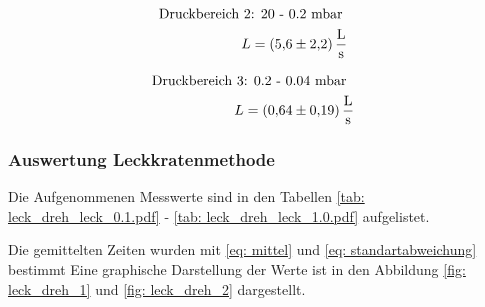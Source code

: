 \begin{align}
  \label{eq:dreh_leit_2}
  \begin{aligned}
  \text{Druckbereich 2} &\text{: 20 - 0.2 mbar}& \\
   L&=\SI{5.6\pm 2.2}{\litre\per\second}
\end{aligned}
\end{align}

\begin{align}
  \label{eq:dreh_leit_3}
  \begin{aligned}
  \text{Druckbereich 3} &\text{: 0.2 - 0.04 mbar}& \\
   L&=\SI{0.64\pm 0.19}{\litre\per\second}
\end{aligned}
\end{align}

\subsubsection{Auswertung Leckkratenmethode}

Die Aufgenommenen Messwerte sind in den Tabellen \ref{tab: leck_dreh_leck_0.1.pdf} - \ref{tab: leck_dreh_leck_1.0.pdf} aufgelistet.





Die gemittelten Zeiten wurden mit \eqref{eq: mittel} und \eqref{eq: standartabweichung} bestimmt
Eine graphische Darstellung der Werte ist in den Abbildung \ref{fig: leck_dreh_1} und \ref{fig: leck_dreh_2} dargestellt.

